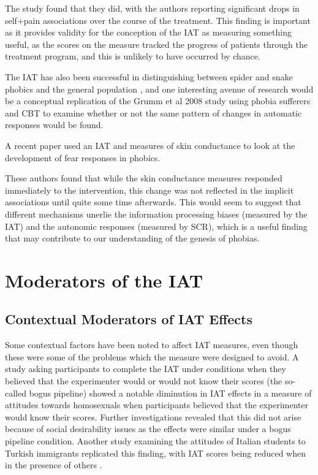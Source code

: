 The study found that they did, with the authors reporting significant drops in self+pain associations over the course of the treatment. This finding is important as it provides validity for the conception of the IAT as measuring something useful, as the scores on the measure tracked the progress of patients through the treatment program, and this is unlikely to have occurred by chance.  

 The IAT has also been successful in distinguishing between spider and snake phobics and the general population \cite{Egloff2002,Lane2007}, and one interesting avenue of research would be a conceptual replication of the Grumm et al 2008 study using phobia sufferers and CBT to examine whether or not the same pattern of changes in automatic responses would be found. 


A recent paper \cite{Boschen2007} used an IAT and measures of skin conductance to look at the development of fear responses in phobics. 

These authors found that while the skin conductance measures responded immediately to the intervention, this change was not reflected in the implicit associations until quite some time afterwards. This would seem to suggest that different mechanisms unerlie the information processing biases (measured by the IAT) and the autonomic responses (measured by SCR), which is a useful finding that may contribute to our understanding of the genesis of phobias. 



\section{Moderators of the IAT}
\label{sec:moderators-iat}

\subsection{Contextual Moderators of IAT Effects}
\label{sec:cont-moder-iat}



Some contextual factors have been noted to affect IAT measures, even though these were some of the problems which the measure were designed to avoid. A study asking participants to complete the IAT under conditions when they believed that the experimenter would or would not know their scores (the so-called bogus pipeline) \cite{Boysen2006} showed a notable diminution in IAT effects in a measure of attitudes towards homosexuals when participants believed that the experimenter would know their scores. Further investigations revealed that this did not arise because of social desirability issues as the effects were similar under a bogus pipeline condition. Another study examining the attitudes of Italian students to Turkish immigrants replicated this finding, with IAT scores being reduced when in the presence of others \cite{Castelli2008}. 

